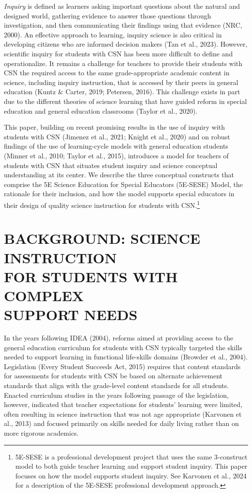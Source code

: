 \documentclass[11.5pt]{sig-alternate} %
\begin{document}
\begin{large}
\textit{Inquiry} is defined as learners asking important questions about the natural and designed world, gathering evidence to answer those questions through investigation, and then communicating their findings using that evidence (NRC, 2000). An effective approach to learning, inquiry science is also critical in developing citizens who are informed decision makers (Tan et al., 2023). However, scientific inquiry for students with CSN has been more difficult to define and operationalize. It remains a challenge for teachers to provide their students with CSN the required access to the same grade-appropriate academic content in science, including inquiry instruction, that is accessed by their peers in general education (Kuntz \& Carter, 2019; Petersen, 2016). This challenge exists in part due to the different theories of science learning that have guided reform in special education and general education classrooms (Taylor et al., 2020). 

This paper, building on recent promising results in the use of inquiry with students with CSN (Jimenez et al., 2021; Knight et al., 2020) and on robust findings of the use of learning-cycle models with general education students (Minner et al., 2010; Taylor et al., 2015), introduces a model for teachers of students with CSN that situates student inquiry and science conceptual understanding at its center. We describe the three conceptual constructs that comprise the 5E Science Education for Special Educators (5E-SESE) Model, the rationale for their inclusion, and how the model supports special educators in their design of quality science instruction for students with CSN.\footnote{5E-SESE is a professional development project that uses the same 3-construct model to both guide teacher learning and support student inquiry. This paper focuses on how the model supports student inquiry. See Karvonen et al., 2024 for a description of the 5E-SESE professional development approach.}

\section*{BACKGROUND: SCIENCE INSTRUCTION \\FOR STUDENTS WITH COMPLEX \\SUPPORT NEEDS}

In the years following IDEA (2004), reforms aimed at providing access to the general education curriculum for students with CSN typically targeted the skills needed to support learning in functional life-skills domains (Browder et al., 2004). Legislation (Every Student Succeeds Act, 2015) requires that content standards for assessments for students with CSN be based on alternate achievement standards that align with the grade-level content standards for all students. Enacted curriculum studies in the years following passage of the legislation, however, indicated that teacher expectations for students’ learning were limited, often resulting in science instruction that was not age appropriate (Karvonen et al., 2013) and focused primarily on skills needed for daily living rather than on more rigorous academics.


\end{large}
\end{document}
